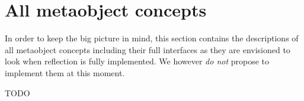 \section{All metaobject concepts}
\label{section-all-Concepts}

In order to keep the big picture in mind, this section
contains the descriptions of all metaobject concepts
including their full interfaces as they are envisioned
to look when reflection is fully implemented. We
however {\em do not} propose to implement them at this moment.

TODO

%
%
%
%
%
%
%
%
%
%
%
%
%
%
%
%
%
%
%
%
%
%
%
%
%
%
%
%
